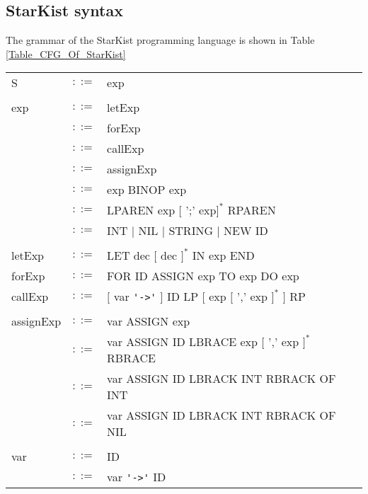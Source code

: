 \documentclass{article}
\begin{document}
\subsection{StarKist syntax}
The grammar of the StarKist programming language is shown in Table \ref{Table_CFG_Of_StarKist}
\begin{table}[h]
\centering
\begin{tabular}{ l c l }
  S                & $::=$ & exp                                                 \\ \\
  exp              & $::=$ & letExp                                              \\
                   & $::=$ & forExp                                              \\
                   & $::=$ & callExp                                             \\
                   & $::=$ & assignExp                                           \\
                   & $::=$ & exp BINOP exp                                       \\
                   & $::=$ & LPAREN exp $[$ ';' exp$]^{*}$ RPAREN                \\
                   & $::=$ & INT $|$ NIL $|$ STRING $|$ NEW ID                   \\ \\
  letExp           & $::=$ & LET dec $[$ dec $]^{*}$ IN exp END                  \\
  forExp           & $::=$ & FOR ID ASSIGN exp TO exp DO exp                     \\
  callExp          & $::=$ & $[$ var \verb"'->'" $]$ ID LP $[$ exp $[$ ',' exp $]^{*}$ $]$ RP \\ \\
  assignExp        & $::=$ & var ASSIGN exp                                      \\
                   & $::=$ & var ASSIGN ID LBRACE exp $[$ ',' exp $]^{*}$ RBRACE \\
                   & $::=$ & var ASSIGN ID LBRACK INT RBRACK OF INT              \\
                   & $::=$ & var ASSIGN ID LBRACK INT RBRACK OF NIL              \\ \\
  var              & $::=$ & ID                                                  \\
                   & $::=$ & var \verb"'->'" ID                                  \\

\end{tabular}
\end{table}
\end{document}
